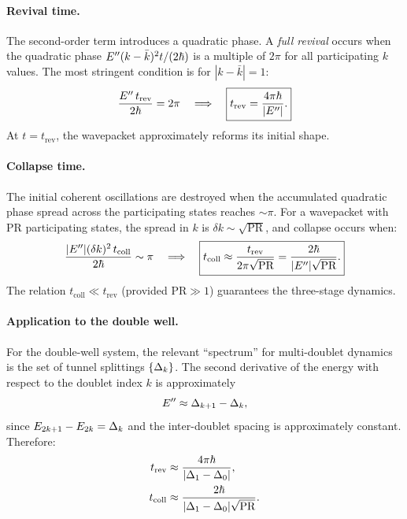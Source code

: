 \paragraph{Revival time.}

The second-order term introduces a quadratic phase.
A \emph{full revival} occurs when the quadratic phase $E''(k-\bar{k})^2 t/(2\hbar)$ is a multiple of $2\pi$ for all participating $k$ values.
The most stringent condition is for $|k - \bar{k}| = 1$:
\begin{equation}
  \frac{E''\,t_{\text{rev}}}{2\hbar} = 2\pi
  \quad\Longrightarrow\quad
  \boxed{t_{\text{rev}} = \frac{4\pi\hbar}{|E''|}.}
  \label{eq:t_rev}
\end{equation}
At $t = t_{\text{rev}}$, the wavepacket approximately reforms its initial shape.

\paragraph{Collapse time.}

The initial coherent oscillations are destroyed when the accumulated quadratic phase spread across the participating states reaches $\sim\pi$.
For a wavepacket with PR participating states, the spread in $k$ is $\delta k \sim \sqrt{\text{PR}}$, and collapse occurs when:
\begin{equation}
  \frac{|E''|(\delta k)^2\,t_{\text{coll}}}{2\hbar} \sim \pi
  \quad\Longrightarrow\quad
  \boxed{t_{\text{coll}} \approx \frac{t_{\text{rev}}}{2\pi\sqrt{\text{PR}}} = \frac{2\hbar}{|E''|\sqrt{\text{PR}}}.}
  \label{eq:t_coll}
\end{equation}
The relation $t_{\text{coll}} \ll t_{\text{rev}}$ (provided $\text{PR} \gg 1$) guarantees the three-stage dynamics.

\paragraph{Application to the double well.}

For the double-well system, the relevant ``spectrum'' for multi-doublet dynamics is the set of tunnel splittings $\{\Delta_k\}$.
The second derivative of the energy with respect to the doublet index $k$ is approximately
\begin{equation}
  E'' \approx \Delta_{k+1} - \Delta_k,
\end{equation}
since $E_{2k+1} - E_{2k} = \Delta_k$ and the inter-doublet spacing is approximately constant.
Therefore:
\begin{align}
  t_{\text{rev}} &\approx \frac{4\pi\hbar}{|\Delta_1 - \Delta_0|},\label{eq:t_rev_DW}\\
  t_{\text{coll}} &\approx \frac{2\hbar}{|\Delta_1 - \Delta_0|\sqrt{\text{PR}}}.\label{eq:t_coll_DW}
\end{align}

